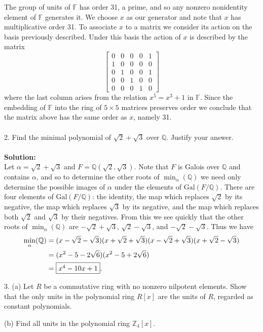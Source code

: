 \documentclass[11pt]{article}
\newcommand{\Z}{\mathbb{Z}}
\newcommand{\Q}{\mathbb{Q}}
\newcommand{\F}{\mathbb{F}}
\begin{document}
The group of units of $\F$ has order 31, a prime, and so any nonzero nonidentity element of $\F$ generates it. We choose $x$ as our generator and note that $x$ has multiplicative order 31. To associate $x$ to a matrix we consider its action on the basis previously described. Under this basis the action of $x$ is described by the matrix \[
\begin{bmatrix}
0&0&0&0&1\\
1&0&0&0&0\\
0&1&0&0&1\\
0&0&1&0&0\\
0&0&0&1&0
\end{bmatrix}
\]
where the last column arises from the relation $x^5 = x^3+1$ in $\F$. Since the embedding of $\F$ into the ring of $5\times 5$ matrices preserves order we conclude that the matrix above has the same order as $x$, namely 31. \\\\

2. Find the minimal polynomial of $\sqrt{2}+\sqrt{3}$ over $\Q$. Justify your answer.\\\\
\textbf{Solution:}\\
Let $\alpha = \sqrt{2}+\sqrt{3}$ and $F = \Q(\sqrt{2},\sqrt{3})$. Note that $F$ is Galois over $\Q$ and contains $\alpha$, and so to determine the other roots of $\min_\alpha(\Q)$ we need only determine the possible images of $\alpha$ under the elements of $\mbox{Gal}(F/\Q)$. There are four elements of $\mbox{Gal}(F/\Q)$: the identity, the map which replaces $\sqrt{2}$ by its negative, the map which replaces $\sqrt{3}$ by its negative, and the map which replaces both $\sqrt{2}$ and $\sqrt{3}$ by their negatives. From this we see quickly that the other roots of $\min_\alpha(\Q)$ are $-\sqrt{2}+\sqrt{3}$, $\sqrt{2}-\sqrt{3}$, and $-\sqrt{2}-\sqrt{3}$. Thus we have \begin{align*}
\min_\alpha(\Q) &= (x-\sqrt{2}-\sqrt{3})(x+\sqrt{2}+\sqrt{3})(x-\sqrt{2}+\sqrt{3})(x+\sqrt{2}-\sqrt{3})\\
& = (x^2 - 5 - 2\sqrt{6})(x^2 -5+2\sqrt{6})\\
& = \fbox{$x^4 -10x +1$}.
\end{align*}

3. (a) Let $R$ be a commutative ring with no nonzero nilpotent elements. Show
that the only units in the polynomial ring $R[x]$ are the units of $R$, regarded as
constant polynomials.

(b) Find all units in the polynomial ring $\Z_4[x]$.\\
\end{document}
